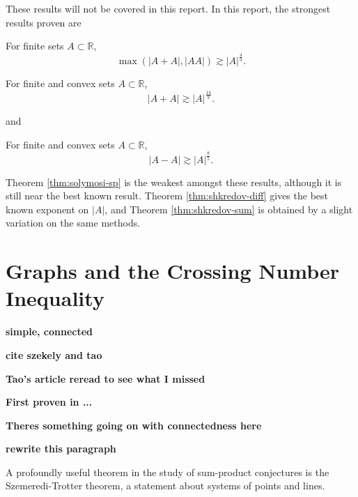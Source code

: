 \documentclass[12pt,reqno]{amsart}
\begin{document}
These results will not be covered in this report. In this report,
the strongest results proven are
\begin{theorem}\label{thm:solymosi-sp}
For finite sets \(A \subset \mathbb{R} \),
\[
    \max \left( \left\lvert A+A \right\rvert , \left\lvert AA \right\rvert  \right) \gtrsim \left\lvert A \right\rvert ^{\frac{4}{3} }
.\]
\end{theorem}
\begin{theorem}\label{thm:shkredov-sum}
For finite and convex sets \(A \subset \mathbb{R} \),
\[
    \left\lvert A + A \right\rvert \gtrsim  \left\lvert A \right\rvert ^{\frac{14}{9} }
.\]
\end{theorem}
and
\begin{theorem}\label{thm:shkredov-diff}
For finite and convex sets \(A \subset \mathbb{R} \),
\[
    \left\lvert A - A \right\rvert \gtrsim \left\lvert A \right\rvert ^{\frac{8}{5} }
.\]
\end{theorem}

Theorem \ref{thm:solymosi-sp} is the weakest amongst these results, although it is
still near the best known result.
Theorem \ref{thm:shkredov-diff} gives the best known exponent on \(\left\lvert A \right\rvert \), and
Theorem \ref{thm:shkredov-sum} is obtained by a slight variation on the same methods.

\section{Graphs and the Crossing Number Inequality}

\textbf{simple, connected}

\textbf{cite szekely and tao}

\textbf{Tao's article reread to see what I missed}

\textbf{First proven in ...}

\textbf{Theres something going on with connectedness here}


\textbf{rewrite this paragraph}

A profoundly useful theorem in the study of sum-product conjectures is the
Szemeredi-Trotter theorem, a statement about systems of points and lines.
\end{document}
